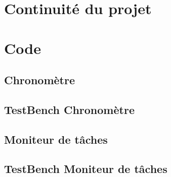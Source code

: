 \documentclass[a4paper,12pt]{report}
\begin{document}
	\section{Continuité du projet}
		\paragraph*{}
		
			
	\section{Code}
		\subsection{Chronomètre}
			
		
		\subsection{TestBench Chronomètre}
			
			
		\subsection{Moniteur de tâches}
			
		
		\subsection{TestBench Moniteur de tâches}
			
			
			
	\clearpage
\end{document}
